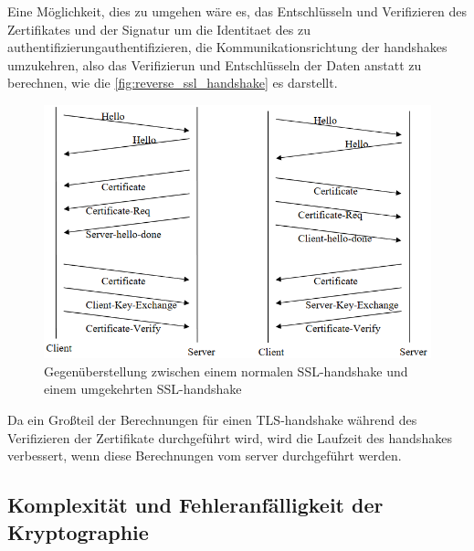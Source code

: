 Eine Möglichkeit, dies zu umgehen wäre es, das Entschlüsseln und Verifizieren des Zertifikates und der Signatur um die Identitaet des  zu \gls{authentifizierung}{authentifizieren}, die Kommunikationsrichtung der \glspl{handshake} umzukehren, also das Verifizierun und Entschlüsseln der Daten  anstatt  zu berechnen\autocite[\vglf][]{cryptoeprint:2006/212}, wie die \autoref{fig:reverse_ssl_handshake}\autocite[]{cryptoeprint:2006/212} es darstellt.
\begin{figure}[htpb]
    \centering
    \includegraphics[width=0.75\linewidth]{abbildungen/reverse_ssl_handshake.png}
    \caption[Gegenüberstellung zwischen einem normalen SSL-Handshake und einem umgekehrten SSL-Handshake]{Gegenüberstellung zwischen einem normalen \ac{SSL}-\gls{handshake} und einem umgekehrten \ac{SSL}-\gls{handshake}\footnotemark}
    \label{fig:reverse_ssl_handshake}
\end{figure}
Da ein Großteil der Berechnungen für einen \ac{TLS}-\gls{handshake} während des Verifizieren der Zertifikate durchgeführt wird, wird die Laufzeit des \glspl{handshake} verbessert, wenn diese Berechnungen vom \gls{server} durchgeführt werden.

\subsection{Komplexität und Fehleranfälligkeit der Kryptographie}\label{subsec:komplexitaet_und_fehleranfaelligkeit_der_kryptographie}

